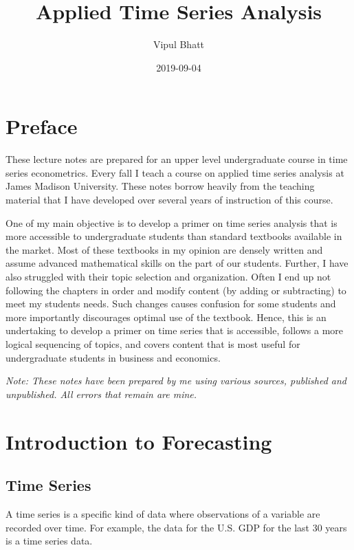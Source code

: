 \documentclass[]{book}
\title{Applied Time Series Analysis}
\author{Vipul Bhatt}
\date{2019-09-04}
\theoremstyle{definition}
\theoremstyle{definition}
\theoremstyle{definition}
\theoremstyle{remark}
\begin{document}
\maketitle

{
\setcounter{tocdepth}{1}
\tableofcontents
}
\hypertarget{preface}{%
\chapter*{Preface}\label{preface}}

These lecture notes are prepared for an upper level undergraduate course in time series econometrics. Every fall I teach a course on applied time series analysis at James Madison University. These notes borrow heavily from the teaching material that I have developed over several years of instruction of this course.

One of my main objective is to develop a primer on time series analysis that is more accessible to undergraduate students than standard textbooks available in the market. Most of these textbooks in my opinion are densely written and assume advanced mathematical skills on the part of our students. Further, I have also struggled with their topic selection and organization. Often I end up not following the chapters in order and modify content (by adding or subtracting) to meet my students needs. Such changes causes confusion for some students and more importantly discourages optimal use of the textbook. Hence, this is an undertaking to develop a primer on time series that is accessible, follows a more logical sequencing of topics, and covers content that is most useful for undergraduate students in business and economics.

\emph{Note: These notes have been prepared by me using various sources, published and unpublished. All errors that remain are mine.}

\hypertarget{intro}{%
\chapter{Introduction to Forecasting}\label{intro}}

\hypertarget{time-series}{%
\section{Time Series}\label{time-series}}

A time series is a specific kind of data where observations of a variable are recorded over time. For example, the data for the U.S. GDP for the last 30 years is a time series data.
\end{document}
